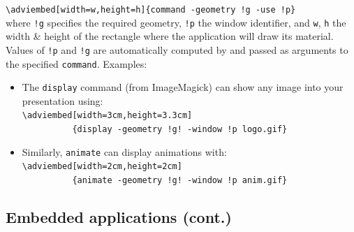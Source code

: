 \documentclass[12pt]{article}
\begin{document}
\verb+\adviembed[width=w,height=h]{command -geometry !g -use !p}+\\

\noindent
where \verb"!g" specifies the required geometry, \verb"!p" the
{\ActiveDVI} window identifier, and \verb"w", \verb"h" the width \&
height of the rectangle where the application will draw its material.
Values of \verb"!p" and \verb"!g" are automatically computed by
{\ActiveDVI} and passed as arguments to the specified \verb"command".
 Examples:

\begin{itemize}
\item The \verb"display" command (from ImageMagick) can show any image into your
presentation using:\\
\verb|\adviembed[width=3cm,height=3.3cm]|\\
\verb|          {display -geometry !g! -window !p logo.gif}|\\

\item Similarly, \verb|animate| can display animations with:\\
        \verb|\adviembed[width=2cm,height=2cm]|\\
        \verb|          {animate -geometry !g! -window !p anim.gif}|\\
\end{itemize}

% 
% 

\newpage

\subsection* {Embedded applications (cont.)}
\end{document}
